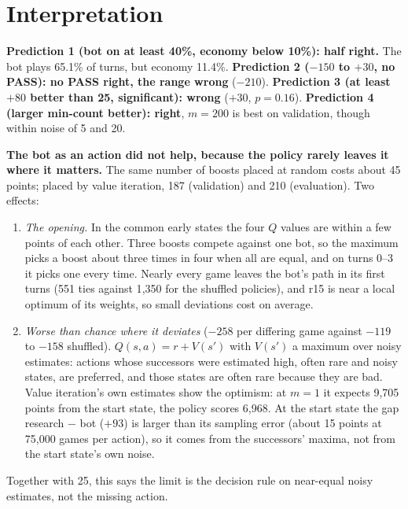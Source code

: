 \documentclass{../polyexp}
\begin{document}
\section{Interpretation}
\textbf{Prediction 1 (bot on at least 40\%, economy below 10\%): half right.} The bot plays 65.1\% of turns, but
economy 11.4\%.
\textbf{Prediction 2 ($-150$ to $+30$, no PASS): no PASS right, the range wrong} ($-210$).
\textbf{Prediction 3 (at least $+80$ better than 25, significant): wrong} ($+30$, $p = 0.16$).
\textbf{Prediction 4 (larger min-count better): right}, $m = 200$ is best on validation, though within noise of
5 and 20.

\textbf{The bot as an action did not help, because the policy rarely leaves it where it matters.} The same number of
boosts placed at random costs about 45 points; placed by value iteration, 187 (validation) and 210 (evaluation). Two
effects:
\begin{enumerate}
  \item \emph{The opening.} In the common early states the four $Q$ values are within a few points of each other.
        Three boosts compete against one bot, so the maximum picks a boost about three times in four when all are
        equal, and on turns 0--3 it picks one every time. Nearly every game leaves the bot's path in its first turns
        (551 ties against 1{,}350 for the shuffled policies), and r15 is near a local optimum of its weights, so
        small deviations cost on average.
  \item \emph{Worse than chance where it deviates} ($-258$ per differing game against $-119$ to $-158$ shuffled).
        $Q(s,a) = r + V(s')$ with $V(s')$ a maximum over noisy estimates: actions whose successors were estimated
        high, often rare and noisy states, are preferred, and those states are often rare because they are bad.
        Value iteration's own estimates show the optimism: at $m = 1$ it expects 9{,}705 points from the start state,
        the policy scores 6{,}968. At the start state the gap research $-$ bot ($+93$) is larger than its sampling
        error (about 15 points at 75{,}000 games per action), so it comes from the successors' maxima, not from the
        start state's own noise.
\end{enumerate}
Together with 25, this says the limit is the decision rule on near-equal noisy estimates, not the missing action.
\end{document}
